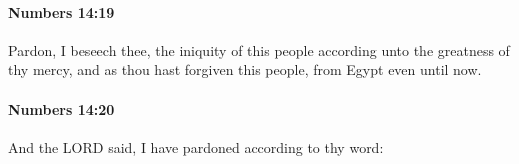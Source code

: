 		\paragraph{Numbers 14:19} %
			\label{NUMBERS-14-19}

			Pardon, I beseech thee, the iniquity of this people according unto the greatness of thy mercy, and as thou hast forgiven this people, from Egypt even until now.


		\paragraph{Numbers 14:20} %
			\label{NUMBERS-14-20}

			And the LORD said, I have pardoned according to thy word:


